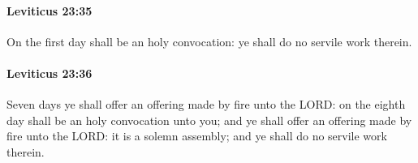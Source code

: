 		\paragraph{Leviticus 23:35} %
			\label{LEVITICUS-23-35}

			On the first day shall be an holy convocation: ye shall do no servile work therein.


		\paragraph{Leviticus 23:36} %
			\label{LEVITICUS-23-36}

			Seven days ye shall offer an offering made by fire unto the LORD: on the eighth day shall be an holy convocation unto you; and ye shall offer an offering made by fire unto the LORD: it is a solemn assembly; and ye shall do no servile work therein.



